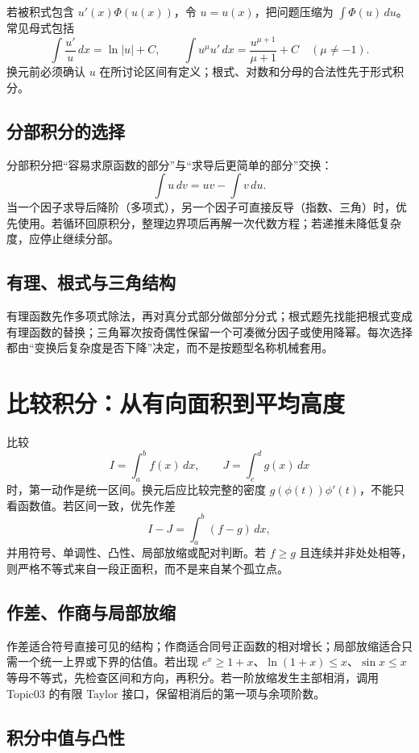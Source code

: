 \documentclass[11pt,a4paper,fontset=fandol]{ctexart}
\begin{document}
若被积式包含 $u'(x)\Phi(u(x))$，令 $u=u(x)$，把问题压缩为 $\int\Phi(u)\,du$。常见母式包括
\[
\int\frac{u'}u\,dx=\ln|u|+C,
\qquad
\int u^\mu u'\,dx=\frac{u^{\mu+1}}{\mu+1}+C\quad(\mu\ne-1).
\]
换元前必须确认 $u$ 在所讨论区间有定义；根式、对数和分母的合法性先于形式积分。

\subsection{分部积分的选择}

分部积分把“容易求原函数的部分”与“求导后更简单的部分”交换：
\[
\int u\,dv=uv-\int v\,du.
\]
当一个因子求导后降阶（多项式），另一个因子可直接反导（指数、三角）时，优先使用。若循环回原积分，整理边界项后再解一次代数方程；若递推未降低复杂度，应停止继续分部。

\subsection{有理、根式与三角结构}

有理函数先作多项式除法，再对真分式部分做部分分式；根式题先找能把根式变成有理函数的替换；三角幂次按奇偶性保留一个可凑微分因子或使用降幂。每次选择都由“变换后复杂度是否下降”决定，而不是按题型名称机械套用。

\section{比较积分：从有向面积到平均高度}

比较
\[
I=\int_a^b{f(x)}\,dx,\qquad J=\int_c^d{g(x)}\,dx
\]
时，第一动作是统一区间。换元后应比较完整的密度 $g(\phi(t))\phi'(t)$，不能只看函数值。若区间一致，优先作差
\[
I-J=\int_a^b(f-g)\,dx,
\]
并用符号、单调性、凸性、局部放缩或配对判断。若 $f\ge g$ 且连续并非处处相等，则严格不等式来自一段正面积，而不是来自某个孤立点。

\subsection{作差、作商与局部放缩}

作差适合符号直接可见的结构；作商适合同号正函数的相对增长；局部放缩适合只需一个统一上界或下界的估值。若出现 $e^x\ge1+x$、$\ln(1+x)\le x$、$\sin x\le x$ 等母不等式，先检查区间和方向，再积分。若一阶放缩发生主部相消，调用 Topic03 的有限 Taylor 接口，保留相消后的第一项与余项阶数。

\subsection{积分中值与凸性}
\end{document}
